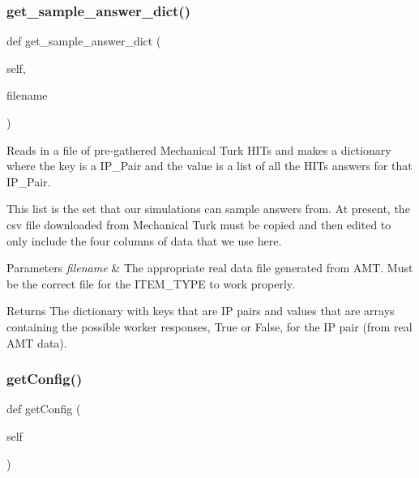 \subsubsection{\texorpdfstring{get\+\_\+sample\+\_\+answer\+\_\+dict()}{get\_sample\_answer\_dict()}}
{\footnotesize\ttfamily def get\+\_\+sample\+\_\+answer\+\_\+dict (\begin{DoxyParamCaption}\item[{}]{self,  }\item[{}]{filename }\end{DoxyParamCaption})}



Reads in a file of pre-\/gathered Mechanical Turk H\+I\+Ts and makes a dictionary where the key is a I\+P\+\_\+\+Pair and the value is a list of all the H\+I\+Ts answers for that I\+P\+\_\+\+Pair. 

This list is the set that our simulations can sample answers from. At present, the csv file downloaded from Mechanical Turk must be copied and then edited to only include the four columns of data that we use here. 
\begin{DoxyParams}{Parameters}
{\em filename} & The appropriate real data file generated from A\+MT. Must be the correct file for the I\+T\+E\+M\+\_\+\+T\+Y\+PE to work properly. \\
\hline
\end{DoxyParams}
\begin{DoxyReturn}{Returns}
The dictionary with keys that are IP pairs and values that are arrays containing the possible worker responses, True or False, for the IP pair (from real A\+MT data). 
\end{DoxyReturn}
\mbox{\label{classdynamicfilterapp_1_1test__simulations_1_1_simulation_test_aea39a5bc56255534b42d16cfeab23aca}} 
\subsubsection{\texorpdfstring{get\+Config()}{getConfig()}}
{\footnotesize\ttfamily def get\+Config (\begin{DoxyParamCaption}\item[{}]{self }\end{DoxyParamCaption})}


